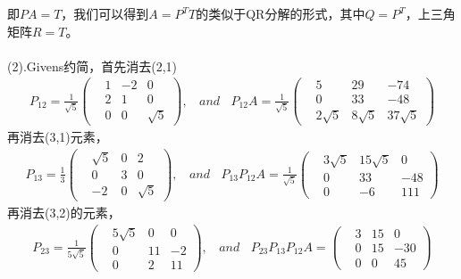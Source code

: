 \documentclass[UTF8,12pt, a4paper]{ctexart}
\begin{document}
  即$PA=T$，我们可以得到$A=P^TT$的类似于QR分解的形式，其中$Q=P^T$，上三角矩阵$R=T$。\\ \\
  (2).Givens约简，首先消去(2,1)
  \begin{align*}
    P_{12} = \frac{1}{\sqrt{5}}
    \left(
      \begin{matrix}
        &1 & -2 &0 \\
        &2 & 1 & 0 \\
        &0 & 0 & \sqrt{5} 
      \end{matrix}
    \right),
    \ \ \ \  and \ \ \ \ 
    P_{12}A=
    \frac{1}{\sqrt{5}}
    \left(
      \begin{matrix}
        &5 & 29 & -74 \\
        &0 &33 &-48 \\
        &2\sqrt{5} &8\sqrt{5} & 37\sqrt{5} 
      \end{matrix}
    \right)
  \end{align*}
  再消去(3,1)元素，
  \begin{align*}
    P_{13} = \frac{1}{3}
    \left(
      \begin{matrix}
        &\sqrt{5} & 0 &2 \\
        &0 & 3 & 0 \\
        &-2 & 0 & \sqrt{5} 
      \end{matrix}
    \right),
    \ \ \ \  and \ \ \ \ 
    P_{13}P_{12}A=
    \frac{1}{\sqrt{5}}
    \left(
      \begin{matrix}
        &3\sqrt{5} & 15\sqrt{5} & 0 \\
        &0 &33 &-48 \\
        &0 &-6 & 111
      \end{matrix}
    \right)
  \end{align*}
  再消去(3,2)的元素，
  \begin{align*}
    P_{23} = \frac{1}{5\sqrt{5}}
    \left(
      \begin{matrix}
        &5\sqrt{5} & 0 &0 \\
        &0 & 11 & -2 \\
        &0 & 2 & 11
      \end{matrix}
    \right),
    \ \ \ \  and \ \ \ \ 
    P_{23}P_{13}P_{12}A=
    \left(
      \begin{matrix}
        &3 &15  &0  \\
        &0 &15 &-30 \\
        &0 &0 &45
      \end{matrix}
    \right)
  \end{align*}
\end{document}
